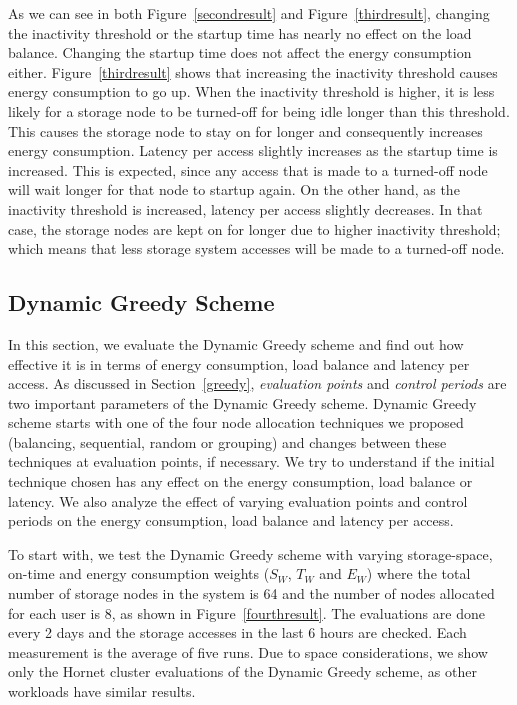 \documentclass[preprint,12pt]{elsarticle}
\begin{document}
As we can see in both Figure~\ref{secondresult} and Figure~\ref{thirdresult}, changing the inactivity threshold or the
startup time has nearly no effect on the load balance. Changing the startup time does not affect the energy consumption
either. Figure~\ref{thirdresult} shows that increasing the inactivity threshold causes energy consumption to go up. When
the inactivity threshold is higher, it is less likely for a storage node to be turned-off for being idle longer
than this threshold. This causes the storage node to stay on for longer and consequently increases energy consumption.
Latency per access slightly increases as the startup time is increased. This is expected, since any access that is made
to a turned-off node will wait longer for that node to startup again. On the other hand, as the inactivity threshold is
increased, latency per access slightly decreases. In that case, the storage nodes are kept on for longer due to higher
inactivity threshold; which means that less storage system accesses will be made to a turned-off node.

\subsection{Dynamic Greedy Scheme}
In this section, we evaluate the Dynamic Greedy scheme and find out how effective it is in terms of energy consumption, 
load balance and latency per access. As discussed in Section~\ref{greedy}, \textit{evaluation points} and
\textit{control periods} are two important parameters of the Dynamic Greedy scheme. Dynamic Greedy scheme starts with
one of the four node allocation techniques we proposed (balancing, sequential, random or grouping) and changes between
these techniques at evaluation points, if necessary. We try to understand if the initial technique chosen has any effect
on the energy consumption, load balance or latency. We also analyze the effect of varying evaluation points and
control periods on the energy consumption, load balance and latency per access.

To start with, we test the Dynamic Greedy scheme with varying storage-space, on-time and energy consumption weights
($S_W$, $T_W$ and $E_W$) where the total number of storage nodes in the system is 64 and the number of nodes allocated
for each user is 8, as shown in Figure~\ref{fourthresult}. The evaluations are done every 2 days and the storage
accesses in the last 6 hours are checked. Each measurement is the average of five runs. Due to space considerations, we
show only the Hornet cluster evaluations of the Dynamic Greedy scheme, as other workloads have similar results.
\end{document}
